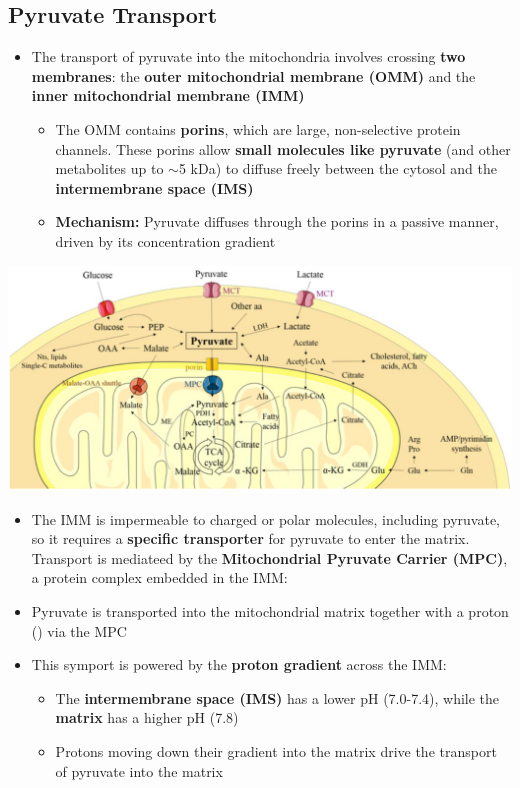 \documentclass[10pt]{article}
\newcommand{\proton}{\text{H$^+$}}
\begin{document}
\subsection*{Pyruvate Transport}
\begin{itemize}
	\item The transport of pyruvate into the mitochondria involves crossing \textbf{two membranes}: the \textbf{outer mitochondrial membrane (OMM)} and the \textbf{inner mitochondrial membrane (IMM)}
	\begin{itemize}
        \item The OMM contains \textbf{porins}, which are large, non-selective protein channels.  These porins allow \textbf{small molecules like pyruvate} (and other metabolites up to $\sim$5 kDa) to diffuse freely between the cytosol and the \textbf{intermembrane space (IMS)}
        \item \textbf{Mechanism:} Pyruvate diffuses through the porins in a passive manner, driven by its concentration gradient
    \end{itemize}
\end{itemize}
\begin{center} 
	\includegraphics*[width=\textwidth]{L3_8.png}
\end{center}
\begin{itemize}
	\item The IMM is impermeable to charged or polar molecules, including pyruvate, so it requires a \textbf{specific transporter} for pyruvate to enter the matrix.  Transport is mediateed by the \textbf{Mitochondrial Pyruvate Carrier (MPC)}, a protein complex embedded in the IMM:
	\item Pyruvate is transported into the mitochondrial matrix together with a proton (\proton) via the MPC
	\item This symport is powered by the \textbf{proton gradient} across the IMM:
	\begin{itemize}
        \item The \textbf{intermembrane space (IMS)} has a lower pH (7.0-7.4), while the \textbf{matrix} has a higher pH (7.8)
        \item Protons moving down their gradient into the matrix drive the transport of pyruvate into the matrix
    \end{itemize}
\end{itemize}
\end{document}
